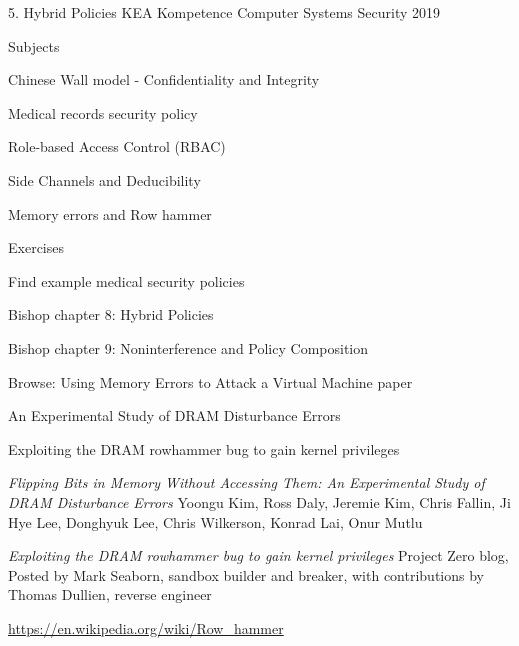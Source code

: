 \documentclass[Screen16to9,17pt]{foils}
\begin{document}
\mytitlepage
{5. Hybrid Policies}
{KEA Kompetence Computer Systems Security 2019}



\begin{list1}
\item Subjects
\begin{list2}
\item Chinese Wall model - Confidentiality and Integrity
\item Medical records security policy
\item Role-based Access Control (RBAC)
\item Side Channels and Deducibility
\item Memory errors and Row hammer
\end{list2}
\item Exercises
\begin{list2}
\item Find example medical security policies
\item
\end{list2}
\end{list1}




\begin{list1}
\item Bishop chapter 8: Hybrid Policies
\item Bishop chapter 9: Noninterference and Policy Composition
\item Browse: Using Memory Errors to Attack a Virtual Machine paper
\item An Experimental Study of DRAM Disturbance Errors
\item Exploiting the DRAM rowhammer bug to gain kernel privileges
\item {}
\end{list1}











\emph{Flipping Bits in Memory Without Accessing Them: An Experimental Study of DRAM Disturbance Errors} Yoongu Kim, Ross Daly, Jeremie Kim, Chris Fallin, Ji Hye Lee, Donghyuk Lee, Chris Wilkerson, Konrad Lai, Onur Mutlu

\emph{Exploiting the DRAM rowhammer bug to gain kernel privileges}
Project Zero blog, Posted by Mark Seaborn, sandbox builder and breaker, with contributions by Thomas Dullien, reverse engineer

\url{https://en.wikipedia.org/wiki/Row_hammer}


\slidenext
\end{document}
